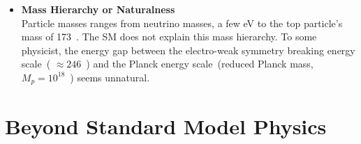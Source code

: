 \begin{itemize}
\item \textbf{Mass Hierarchy or Naturalness} \mbox{}\\
Particle masses ranges from neutrino masses, a few eV to the \textsf{top} particle's mass of 173~\GeVcc.
The SM does not explain this mass hierarchy.
To some physicist, the energy gap between the electro-weak symmetry breaking energy scale~( $\approx 246$~\GeV) and the Planck energy scale~(reduced Planck mass, $M_{p} = 10^{18}$~\GeV) seems unnatural.

\end{itemize}

\section{Beyond Standard Model Physics}

